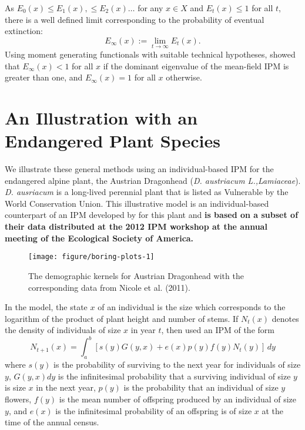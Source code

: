 \documentclass[12pt]{amsart}\usepackage[]{graphicx}\usepackage[]{color}
\makeatletter
\def\maxwidth{ %
  \ifdim\Gin@nat@width>\linewidth
    \linewidth
  \else
    \Gin@nat@width
  \fi
}
\newenvironment{knitrout}{}{} %
\makeatother
\begin{document}
As $E_0(x)\le E_1(x),\le E_2(x)\dots$ for any $x\in X$ and $E_t(x)\le 1$ for all $t$, there is a well defined limit corresponding to the probability of eventual extinction:
\[
E_\infty(x):=\lim_{t\to\infty} E_t(x).
\]
Using moment generating functionals with suitable technical hypotheses, \citet{harris-63} showed that $E_\infty(x)<1$ for all $x$ if the dominant eigenvalue of the mean-field IPM is greater than one, and $E_\infty(x)=1$ for all $x$ otherwise.

\section*{An Illustration with an Endangered Plant Species}

We illustrate these general methods using an individual-based IPM for the endangered alpine plant, the Austrian Dragonhead (\emph{D. austriacum L.,Lamiaceae}). \emph{D. ausriacum} is a long-lived perennial plant that is listed as Vulnerable by the World Conservation Union.  This illustrative model is an individual-based counterpart of an IPM developed by \citet{nicole-etal-11} for this plant and \textbf{is based on a subset of their data distributed at the 2012 IPM workshop at the annual meeting of the Ecological Society of America.}

\begin{knitrout}
\color{fgcolor}\begin{figure}
\texttt{[image: figure/boring-plots-1]} \caption[The demographic kernels for Austrian Dragonhead with the corresponding data from Nicole et al]{The demographic kernels for Austrian Dragonhead with the corresponding data from Nicole et al. (2011).}\label{fig:boring-plots}
\end{figure}


\end{knitrout}

In the model, the state $x$ of an individual is the size which corresponds to the logarithm of the product of plant height and number of stems. If $N_t(x)$ denotes the density of individuals of size $x$ in year $t$, then \citet{nicole-etal-11} used an IPM of the form
\[
N_{t+1}(x)=\int_a^b \left[ s(y)G(y,x)+e(x)p(y)f(y)N_t(y)\right]\,dy
\]
where $s(y)$ is the probability of surviving to the next year for individuals of size $y$, $G(y,x)dy$ is the infinitesimal probability that a surviving individual of size $y$ is size $x$ in the next year, $p(y)$ is the probability that an individual of size $y$ flowers, $f(y)$ is the mean number of offspring produced by an individual of size $y$, and $e(x)$ is the infinitesimal probability of an offspring is of size $x$ at the time of the annual census.
\end{document}
